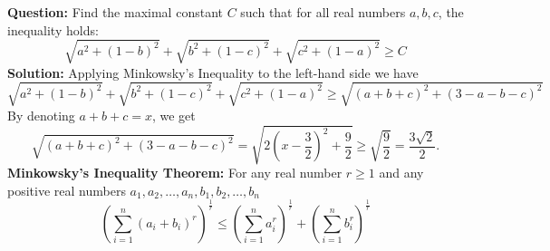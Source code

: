 \begin{examplebox}
    \footnotesize
    \textbf{Question:} Find the maximal constant $C$ such that for all real numbers $a, b, c$, the inequality holds:$$\sqrt{a^{2}+(1-b)^{2}}+\sqrt{b^{2}+(1-c)^{2}}+\sqrt{c^{2}+(1-a)^{2}} \geq C$$
    \textbf{Solution:} Applying Minkowsky's Inequality to the left-hand side we have$$\sqrt{a^{2}+(1-b)^{2}}+\sqrt{b^{2}+(1-c)^{2}}+\sqrt{c^{2}+(1-a)^{2}} \geq \sqrt{(a+b+c)^{2}+(3-a-b-c)^{2}}$$ By denoting $a+b+c=x$, we get$$\sqrt{(a+b+c)^{2}+(3-a-b-c)^{2}}=\sqrt{2\left(x-\frac{3}{2}\right)^{2}+\frac{9}{2}} \geq \sqrt{\frac{9}{2}}=\boxed{\frac{3 \sqrt{2}}{2}}.$$
    \textbf{Minkowsky's Inequality Theorem:} For any real number $r \geq 1$ and any positive real numbers $a_{1}, a_{2}, \ldots, a_{n}, b_{1}, b_{2}, \ldots, b_{n}$$$\left(\sum_{i=1}^{n}\left(a_{i}+b_{i}\right)^{r}\right)^{\frac{1}{r}} \leq\left(\sum_{i=1}^{n} a_{i}^{r}\right)^{\frac{1}{r}}+\left(\sum_{i=1}^{n} b_{i}^{r}\right)^{\frac{1}{r}}$$
\end{examplebox}

